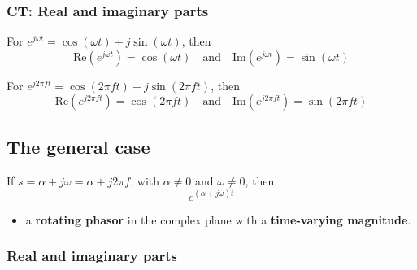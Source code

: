    \subsubsection{CT: Real and imaginary parts}
    \begin{definition}
        For $e^{j\omega t} = \cos(\omega t) + j \sin(\omega t)$, then 
        \begin{equation}
            \text{Re}(e^{j\omega t}) = \cos(\omega t) \quad \text{and} \quad \text{Im}(e^{j\omega t}) = \sin(\omega t)
        \end{equation}

        For $e^{j 2\pi f t} = \cos(2\pi f t) + j \sin(2\pi f t)$, then 
        \begin{equation}
            \text{Re}(e^{j 2\pi f t}) = \cos(2\pi f t) \quad \text{and} \quad \text{Im}(e^{j 2\pi f t}) = \sin(2\pi f t)
        \end{equation}
        
    \end{definition}

\subsection{The general case}
\begin{definition}
    If \(s = \alpha + j\omega = \alpha + j 2\pi f\), with \(\alpha \neq 0\) and \(\omega \neq 0\), then 
    \begin{equation}
        e^{(\alpha + j\omega)t}
    \end{equation}
    \begin{itemize}
        \item a \textbf{rotating phasor} in the complex plane with a \textbf{time-varying magnitude}.
    \end{itemize} 
\end{definition}

    \subsubsection{Real and imaginary parts}
    \begin{definition}
    \end{definition}

